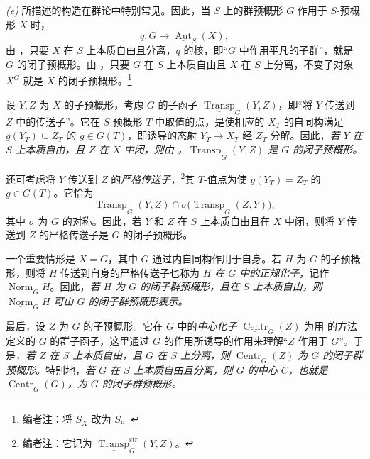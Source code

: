 \smallskip
\noindent{}\textit{(e)}
所描述的构造在群论中特别常见。因此，当 \(S\) 上的群预概形 \(G\) 作用于 \(S\)-预概形 \(X\) 时，
\[
  q:G\longrightarrow\underline{\operatorname{Aut}}_S(X),
\]
由 ，只要 \(X\) 在 \(S\) 上本质自由且分离，\(q\) 的核，即“\(G\) 中作用平凡的子群”，就是 \(G\) 的闭子预概形。由 ，只要 \(G\) 在 \(S\) 上本质自由且 \(X\) 在 \(S\) 上分离，不变子对象 \(X^G\) 就是 \(X\) 的闭子预概形。\footnote{编者注：将 \(S_X\) 改为 \(S\)。}

设 \(Y,Z\) 为 \(X\) 的子预概形，考虑 \(G\) 的子函子 \(\underline{\operatorname{Transp}}_G(Y,Z)\)，即“将 \(Y\) 传送到 \(Z\) 中的传送子”。它在 \(S\)-预概形 \(T\) 中取值的点，是使相应的 \(X_T\) 的自同构满足 \(g(Y_T)\subseteq Z_T\) 的 \(g\in G(T)\)，即诱导的态射 \(Y_T\to X_T\) 经 \(Z_T\) 分解。因此，\textit{若 \(Y\) 在 \(S\) 上本质自由，且 \(Z\) 在 \(X\) 中闭，则由 ，\(\underline{\operatorname{Transp}}_G(Y,Z)\) 是 \(G\) 的闭子预概形。}

还可考虑将 \(Y\) 传送到 \(Z\) 的\emph{严格传送子}，\footnote{编者注：它记为 \(\underline{\operatorname{Transp}}^{\mathrm{str}}_G(Y,Z)\)。}其 \(T\)-值点为使 \(g(Y_T)=Z_T\) 的 \(g\in G(T)\)。它恰为
\[
  \underline{\operatorname{Transp}}_G(Y,Z)
  \cap
  \sigma\bigl(\underline{\operatorname{Transp}}_G(Z,Y)\bigr),
\]
其中 \(\sigma\) 为 \(G\) 的对称。因此，若 \(Y\) 和 \(Z\) 在 \(S\) 上本质自由且在 \(X\) 中闭，则将 \(Y\) 传送到 \(Z\) 的严格传送子是 \(G\) 的闭子预概形。

一个重要情形是 \(X=G\)，其中 \(G\) 通过内自同构作用于自身。若 \(H\) 为 \(G\) 的子预概形，则将 \(H\) 传送到自身的严格传送子也称为 \emph{\(H\) 在 \(G\) 中的正规化子}，记作 \(\underline{\operatorname{Norm}}_G H\)。因此，\textit{若 \(H\) 为 \(G\) 的闭子群预概形，且在 \(S\) 上本质自由，则 \(\underline{\operatorname{Norm}}_G H\) 可由 \(G\) 的闭子群预概形表示。}

最后，设 \(Z\) 为 \(G\) 的子预概形。它在 \(G\) 中的\emph{中心化子} \(\underline{\operatorname{Centr}}_G(Z)\) 为用  的方法定义的 \(G\) 的群子函子，这里通过 \(G\) 的作用所诱导的作用来理解“\(Z\) 作用于 \(G\)”。于是，\textit{若 \(Z\) 在 \(S\) 上本质自由，且 \(G\) 在 \(S\) 上分离，则 \(\underline{\operatorname{Centr}}_G(Z)\) 为 \(G\) 的闭子群预概形。}特别地，\textit{若 \(G\) 在 \(S\) 上本质自由且分离，则 \(G\) 的中心 \(C\)，也就是 \(\underline{\operatorname{Centr}}_G(G)\)，为 \(G\) 的闭子群预概形。}

